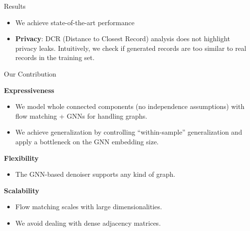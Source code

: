\begin{frame}[fragile]{Results}
\begin{table}[ht]
\end{table}

  \begin{itemize}
    \item We achieve state-of-the-art performance
    \item \textbf{Privacy}: DCR (Distance to Closest Record) analysis does not highlight privacy leaks. Intuitively, we check if generated records are too similar to real records in the training set.
  \end{itemize}

\end{frame}

\begin{frame}[fragile]{Our Contribution}

  \textbf{Expressiveness}
  \begin{itemize}
    \item We model whole connected components (no independence assumptions) with flow matching + GNNs for handling graphs.
    \item We achieve generalization by controlling ``within-sample'' generalization and apply a bottleneck on the GNN embedding size.
  \end{itemize}

  \textbf{Flexibility}
  \begin{itemize}
    \item The GNN-based denoiser supports any kind of graph.
  \end{itemize}

  \textbf{Scalability}
  \begin{itemize}
    \item Flow matching scales with large dimensionalities.
    \item We avoid dealing with dense adjacency matrices.
  \end{itemize}

\end{frame}

